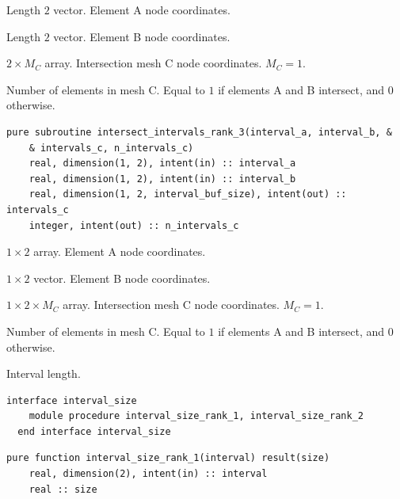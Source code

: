 \documentclass{article}
\begin{document}
\begin{description}[font=\ttfamily\bfseries,leftmargin=2.2\parindent,labelindent=1.7\parindent,noitemsep]
  \item[interval\_a] Length $2$ vector. Element A node coordinates.
  \item[interval\_b] Length $2$ vector. Element B node coordinates.
  \item[interval\_c] $2 \times M_C$ array. Intersection mesh C node coordinates.
     $M_C = 1$.
  \item[n\_intervals\_c] Number of elements in mesh C. Equal to $1$ if elements
    A and B intersect, and $0$ otherwise.
\end{description}
  
\begin{lstlisting}[language=FORTRAN]  
  pure subroutine intersect_intervals_rank_3(interval_a, interval_b, &
    & intervals_c, n_intervals_c)
    real, dimension(1, 2), intent(in) :: interval_a
    real, dimension(1, 2), intent(in) :: interval_b
    real, dimension(1, 2, interval_buf_size), intent(out) :: intervals_c
    integer, intent(out) :: n_intervals_c
\end{lstlisting} 

\begin{description}[font=\ttfamily\bfseries,leftmargin=2.2\parindent,labelindent=1.7\parindent,noitemsep]
  \item[interval\_a] $1 \times 2$ array. Element A node coordinates.
  \item[interval\_b] $1 \times 2$ vector. Element B node coordinates.
  \item[interval\_c] $1 \times 2 \times M_C$ array. Intersection mesh C node
    coordinates. $M_C = 1$.
  \item[n\_intervals\_c] Number of elements in mesh C. Equal to $1$ if elements
    A and B intersect, and $0$ otherwise.
\end{description}

\noindent Interval length.
  
\begin{lstlisting}[language=FORTRAN]  
  interface interval_size
    module procedure interval_size_rank_1, interval_size_rank_2
  end interface interval_size
\end{lstlisting} 
  
\begin{lstlisting}[language=FORTRAN]  
  pure function interval_size_rank_1(interval) result(size)
    real, dimension(2), intent(in) :: interval
    real :: size
\end{lstlisting} 
\end{document}
